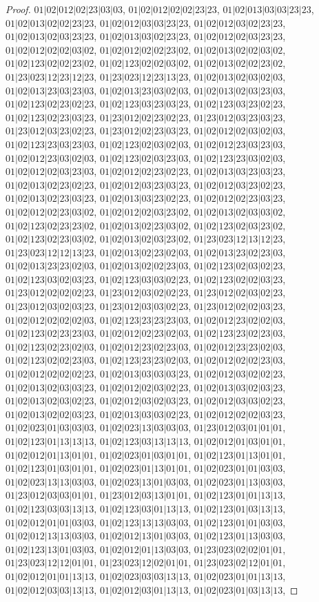 \documentclass[12pt]{article}
\theoremstyle{plain}
\theoremstyle{definition}
\theoremstyle{remark}
\begin{document}
\begin{proof}
$01|02|012|02|23|03|03$, $01|02|012|02|02|23|23$, $01|02|013|03|03|23|23$, $01|02|013|02|02|23|23$, $01|02|012|03|03|23|23$, $01|02|012|03|02|23|23$, $01|02|013|02|03|23|23$, $01|02|013|03|02|23|23$, $01|02|012|02|03|23|23$, $01|02|012|02|02|03|02$, $01|02|012|02|02|23|02$, $01|02|013|02|02|03|02$, $01|02|123|02|02|23|02$, $01|02|123|02|02|03|02$, $01|02|013|02|02|23|02$, $01|23|023|12|23|12|23$, $01|23|023|12|23|13|23$, $01|02|013|02|03|02|03$, $01|02|013|23|03|23|03$, $01|02|013|23|03|02|03$, $01|02|013|02|03|23|03$, $01|02|123|02|23|02|23$, $01|02|123|03|23|03|23$, $01|02|123|03|23|02|23$, $01|02|123|02|23|03|23$, $01|23|012|02|23|02|23$, $01|23|012|03|23|03|23$, $01|23|012|03|23|02|23$, $01|23|012|02|23|03|23$, $01|02|012|02|03|02|03$, $01|02|123|23|03|23|03$, $01|02|123|02|03|02|03$, $01|02|012|23|03|23|03$, $01|02|012|23|03|02|03$, $01|02|123|02|03|23|03$, $01|02|123|23|03|02|03$, $01|02|012|02|03|23|03$, $01|02|012|02|23|02|23$, $01|02|013|03|23|03|23$, $01|02|013|02|23|02|23$, $01|02|012|03|23|03|23$, $01|02|012|03|23|02|23$, $01|02|013|02|23|03|23$, $01|02|013|03|23|02|23$, $01|02|012|02|23|03|23$, $01|02|012|02|23|03|02$, $01|02|012|02|03|23|02$, $01|02|013|02|03|03|02$, $01|02|123|02|23|23|02$, $01|02|013|02|23|03|02$, $01|02|123|02|03|23|02$, $01|02|123|02|23|03|02$, $01|02|013|02|03|23|02$, $01|23|023|12|13|12|23$, $01|23|023|12|12|13|23$, $01|02|013|02|23|02|03$, $01|02|013|23|02|23|03$, $01|02|013|23|23|02|03$, $01|02|013|02|02|23|03$, $01|02|123|02|03|02|23$, $01|02|123|03|02|03|23$, $01|02|123|03|03|02|23$, $01|02|123|02|02|03|23$, $01|23|012|02|02|02|23$, $01|23|012|03|02|02|23$, $01|23|012|02|03|02|23$, $01|23|012|03|02|03|23$, $01|23|012|03|03|02|23$, $01|23|012|02|02|03|23$, $01|02|012|02|02|02|03$, $01|02|123|23|23|23|03$, $01|02|012|23|02|02|03$, $01|02|123|02|23|23|03$, $01|02|012|02|23|02|03$, $01|02|123|23|02|23|03$, $01|02|123|02|23|02|03$, $01|02|012|23|02|23|03$, $01|02|012|23|23|02|03$, $01|02|123|02|02|23|03$, $01|02|123|23|23|02|03$, $01|02|012|02|02|23|03$, $01|02|012|02|02|02|23$, $01|02|013|03|03|03|23$, $01|02|012|03|02|02|23$, $01|02|013|02|03|03|23$, $01|02|012|02|03|02|23$, $01|02|013|03|02|03|23$, $01|02|013|02|03|02|23$, $01|02|012|03|02|03|23$, $01|02|012|03|03|02|23$, $01|02|013|02|02|03|23$, $01|02|013|03|03|02|23$, $01|02|012|02|02|03|23$, $01|02|023|01|03|03|03$, $01|02|023|13|03|03|03$, $01|23|012|03|01|01|01$, $01|02|123|01|13|13|13$, $01|02|123|03|13|13|13$, $01|02|012|01|03|01|01$, $01|02|012|01|13|01|01$, $01|02|023|01|03|01|01$, $01|02|123|01|13|01|01$, $01|02|123|01|03|01|01$, $01|02|023|01|13|01|01$, $01|02|023|01|01|03|03$, $01|02|023|13|13|03|03$, $01|02|023|13|01|03|03$, $01|02|023|01|13|03|03$, $01|23|012|03|03|01|01$, $01|23|012|03|13|01|01$, $01|02|123|01|01|13|13$, $01|02|123|03|03|13|13$, $01|02|123|03|01|13|13$, $01|02|123|01|03|13|13$, $01|02|012|01|01|03|03$, $01|02|123|13|13|03|03$, $01|02|123|01|01|03|03$, $01|02|012|13|13|03|03$, $01|02|012|13|01|03|03$, $01|02|123|01|13|03|03$, $01|02|123|13|01|03|03$, $01|02|012|01|13|03|03$, $01|23|023|02|02|01|01$, $01|23|023|12|12|01|01$, $01|23|023|12|02|01|01$, $01|23|023|02|12|01|01$, $01|02|012|01|01|13|13$, $01|02|023|03|03|13|13$, $01|02|023|01|01|13|13$, $01|02|012|03|03|13|13$, $01|02|012|03|01|13|13$, $01|02|023|01|03|13|13$, 
\end{proof}
\end{document}
